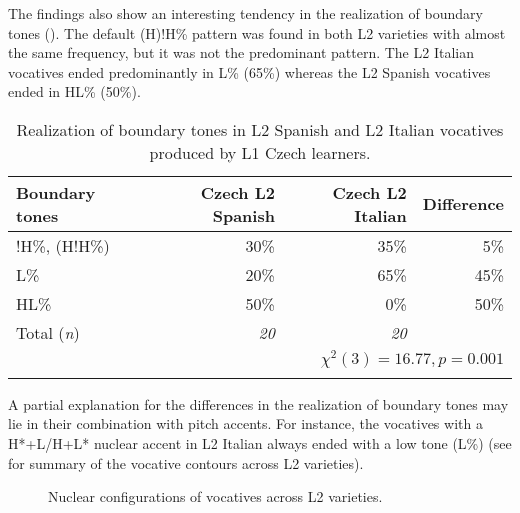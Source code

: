 The findings also show an interesting tendency in the realization of boundary tones (). The default (H)!H\% pattern was found in both L2 varieties with almost the same frequency, but it was not the predominant pattern. The L2 Italian vocatives ended predominantly in L\% (65\%) whereas the L2 Spanish vocatives ended in HL\% (50\%).

\begin{table}
\begin{tabularx}{\textwidth}{Qrrr}

\lsptoprule

{Boundary tones} & {Czech L2 Spanish} & {Czech L2 Italian} & {Difference}\\
\midrule
!H\%, (H!H\%) &  30\% &  35\% &  5\%\\
L\% &  20\% &  65\% &  45\%\\
HL\% &  50\% &  0\% & 50\%\\
\midrule
Total (\textit{n}) & {\itshape 20} & {\itshape 20} &  \\
\\
\lspbottomrule
\end{tabularx}

\caption{Realization of boundary tones in L2 Spanish and L2 Italian vocatives produced by L1 Czech learners.}
\label{tab:4.38}
\end{table}

A partial explanation for the differences in the realization of boundary tones may lie in their combination with pitch accents. For instance, the vocatives with a H*+L/H+L* nuclear accent in L2 Italian always ended with a low tone (L\%) (see  for summary of the vocative contours across L2 varieties).

\begin{figure}



\caption{Nuclear configurations of vocatives across L2 varieties.}
\label{fig:4.142}
\end{figure}

